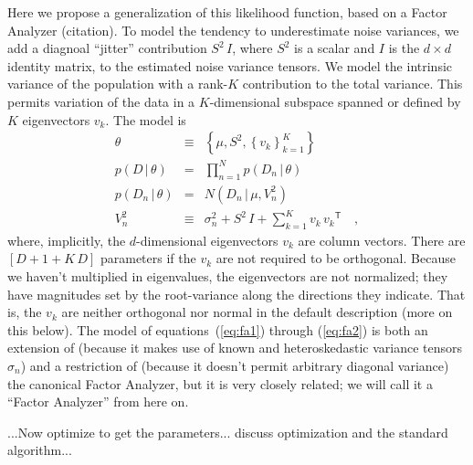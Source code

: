 \documentclass[12pt]{article}
\newcommand{\equationname}{equation}
\newcommand{\equationnames}{\equationname s}
\newcommand{\given}{\,|\,}
\newcommand{\setof}[1]{\left\{{#1}\right\}}
\newcommand{\transpose}[1]{{#1}^{\!{\mathsf{T}}}}
\begin{document}
Here we propose a generalization of this likelihood function, based on
a Factor Analyzer (citation).  To model the tendency to underestimate
noise variances, we add a diagnoal ``jitter'' contribution $S^2\,I$,
where $S^2$ is a scalar and $I$ is the $d\times d$ identity matrix, to
the estimated noise variance tensors.  We model the intrinsic variance
of the population with a rank-$K$ contribution to the total variance.
This permits variation of the data in a $K$-dimensional subspace
spanned or defined by $K$ eigenvectors $v_k$.  The model is
\begin{eqnarray}\label{eq:fa1}
\theta
 &\equiv&
\setof{\mu, S^2, \setof{v_k}_{k=1}^K}
\\
p(D\given\theta)
 &=&
\prod_{n=1}^N p(D_n\given\theta)
\\
p(D_n\given\theta)
 &=&
N(D_n\given\mu,V^2_n)
\\\label{eq:fa2}
V^2_n
 &\equiv&
\sigma^2_n + S^2\,I + \sum_{k=1}^K v_k\,\transpose{v_k}
\quad ,
\end{eqnarray}
where, implicitly, the $d$-dimensional eigenvectors $v_k$ are column
vectors.  There are $[D + 1 + K\,D]$ parameters if the $v_k$ are not
required to be orthogonal.  Because we haven't multiplied in
eigenvalues, the eigenvectors are not normalized; they have magnitudes
set by the root-variance along the directions they indicate.  That is,
the $v_k$ are neither orthogonal nor normal in the default description
(more on this below).  The model of \equationnames~(\ref{eq:fa1})
through (\ref{eq:fa2}) is both an extension of (because it makes use
of known and heteroskedastic variance tensors $\sigma_n$) and a
restriction of (because it doesn't permit arbitrary diagonal variance)
the canonical Factor Analyzer, but it is very closely related; we will
call it a ``Factor Analyzer'' from here on.

...Now optimize to get the parameters... discuss optimization and the
standard algorithm...
\end{document}
